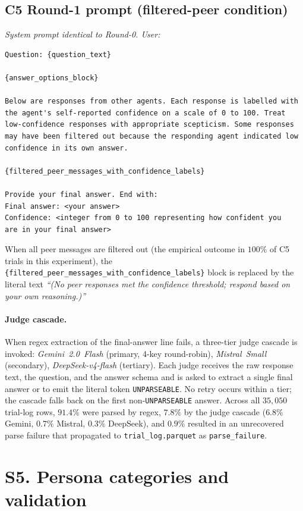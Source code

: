 \documentclass[review,3p,authoryear]{elsarticle}
\begin{document}
\subsection*{C5 Round-1 prompt (filtered-peer condition)}
\textit{System prompt identical to Round-0. User:}
\begin{verbatim}
Question: {question_text}

{answer_options_block}

Below are responses from other agents. Each response is labelled with
the agent's self-reported confidence on a scale of 0 to 100. Treat
low-confidence responses with appropriate scepticism. Some responses
may have been filtered out because the responding agent indicated low
confidence in its own answer.

{filtered_peer_messages_with_confidence_labels}

Provide your final answer. End with:
Final answer: <your answer>
Confidence: <integer from 0 to 100 representing how confident you
are in your final answer>
\end{verbatim}
When all peer messages are filtered out (the empirical outcome in
$100\%$ of C5 trials in this experiment), the
\verb|{filtered_peer_messages_with_confidence_labels}| block is
replaced by the literal text
\textit{``(No peer responses met the confidence threshold; respond
based on your own reasoning.)''}

\paragraph{Judge cascade.}
When regex extraction of the final-answer line fails, a three-tier
judge cascade is invoked: \textit{Gemini~2.0~Flash} (primary, 4-key
round-robin), \textit{Mistral~Small} (secondary),
\textit{DeepSeek-v4-flash} (tertiary).
Each judge receives the raw response text, the question, and the
answer schema and is asked to extract a single final answer or to
emit the literal token \texttt{UNPARSEABLE}.
No retry occurs within a tier; the cascade falls back on the first
non-\texttt{UNPARSEABLE} answer.
Across all $35{,}050$ trial-log rows, $91.4\%$ were parsed by regex,
$7.8\%$ by the judge cascade ($6.8\%$ Gemini, $0.7\%$ Mistral,
$0.3\%$ DeepSeek), and $0.9\%$ resulted in an unrecovered parse
failure that propagated to \texttt{trial\_log.parquet} as
\texttt{parse\_failure}.

\section*{S5. Persona categories and validation}
\label{ssec:personas}
\end{document}
